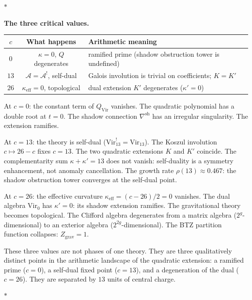 \documentclass[11pt]{article}
\newcommand{\cA}{\mathcal{A}}
\newcommand{\sep}{\bigskip\begin{center}$*$\end{center}\medskip}
\begin{document}
\sep

\noindent\textbf{The three critical values.}\enspace
\begin{center}
\small
\renewcommand{\arraystretch}{1.15}
\begin{tabular}{@{}ccl@{}}
$c$ & \textbf{What happens} & \textbf{Arithmetic meaning} \\
\hline
$0$ & $\kappa = 0$, $Q$ degenerates & ramified prime
  (shadow obstruction tower is undefined) \\[3pt]
$13$ & $\cA = \cA^!$, self-dual
  & Galois involution is trivial on coefficients;
  $K = K'$ \\[3pt]
$26$ & $\kappa_{\mathrm{eff}} = 0$, topological & dual
  extension $K'$ degenerates ($\kappa' = 0$)
\end{tabular}
\end{center}

\medskip

At $c = 0$: the constant term of $Q_{\mathrm{Vir}}$ vanishes.
The quadratic polynomial has a double root at $t = 0$.  The
shadow connection $\nabla^{\mathrm{sh}}$ has an irregular
singularity.  The extension ramifies.

At $c = 13$: the theory is self-dual ($\mathrm{Vir}_{13}^!
= \mathrm{Vir}_{13}$).  The Koszul involution $c \mapsto 26-c$
fixes $c = 13$.  The two quadratic extensions $K$ and $K'$
coincide.  The complementarity sum $\kappa + \kappa' = 13$
does not vanish: self-duality is a symmetry enhancement, not
anomaly cancellation.  The growth rate $\rho(13) \approx 0.467$:
the shadow obstruction tower converges at the self-dual point.

At $c = 26$: the effective curvature $\kappa_{\mathrm{eff}}
= (c{-}26)/2 = 0$ vanishes.  The dual algebra
$\mathrm{Vir}_0$ has $\kappa' = 0$: its shadow extension
ramifies.  The gravitational theory becomes topological.  The
Clifford algebra degenerates from a matrix algebra
($2^g$-dimensional) to an exterior algebra
($2^{2g}$-dimensional).  The BTZ partition function collapses:
$Z_{\mathrm{grav}} = 1$.

These three values are not phases of one theory.  They are three
qualitatively distinct points in the arithmetic landscape of the
quadratic extension: a ramified prime ($c = 0$), a self-dual
fixed point ($c = 13$), and a degeneration of the dual
($c = 26$).  They are separated by $13$ units of central charge.

\sep
\end{document}
